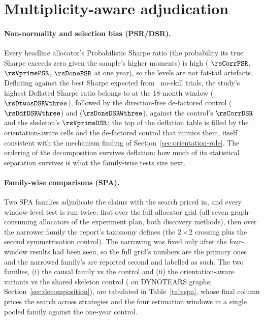 \section{Multiplicity-aware adjudication}
\label{sec:believe-rigour}


\paragraph{Non-normality and selection bias (PSR/DSR).} Every headline
allocator's Probabilistic Sharpe ratio (the probability its true Sharpe
exceeds zero given the sample's higher moments) is high (\HRP{}
$\rsCorrPSR$, \skelsamp{} $\rsVprimePSR$, \skelsem{} $\rsDonePSR$ at
one year), so the
levels are not fat-tail artefacts. Deflating against the best Sharpe
expected from \rsNtrials\ no-skill trials, the study's highest Deflated
Sharpe ratio belongs to \orientsem{} at the 18-month window
($\rsDtwosDSRWthree$), followed by the direction-free de-factored
control ($\rsDdfDSRWthree$) and \skelsem{} ($\rsDoneDSRWthree$), against
the control's $\rsCorrDSR$ and the skeleton's
$\rsVprimeDSR$; the top of the deflation table is filled by the
orientation-aware cells and the de-factored control that mimics them,
itself consistent with the mechanism finding of
Section~\ref{sec:orientation-role}. The ordering of the decomposition survives deflation;
how much of its statistical separation survives is what the family-wise
tests size next.

\paragraph{Family-wise comparisons (SPA).} Two SPA families
adjudicate the claims with the search priced in, and every window-level
test is run twice: first over the full allocator grid (all
seven graph-consuming allocators of the experiment plan, both discovery
methods), then over the
narrower family the report's taxonomy defines (the $2\times2$ crossing
plus the second symmetrisation control). The narrowing was fixed only
after the four-window results had been seen, so the full grid's
numbers are the primary ones and the narrowed family's are reported
second and labelled as such. The two families, (i)
the causal family vs the \HRP{} control and (ii) the
orientation-aware variants vs the shared skeleton control (\skelsamp{}
on DYNOTEARS graphs; Section~\ref{sec:decomposition}), are tabulated in
Table~\ref{tab:spa}, whose final column prices the search across
strategies and the four estimation windows in a single pooled
family against the one-year control.

